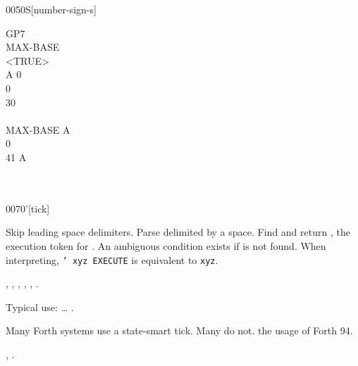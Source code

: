 \begin{worddef}[numS]{0050}{\num{}S}[number-sign-s]
\begin{testing}
		\word{:} GP7 \\
		\tab	{}  		MAX-BASE  \word{!} \\
		\tab	<TRUE> \\
		\tab	A 0  \\
		\tab[2]		 0    \\
		 \word{=}    30 \word{+} \word{=} \word{AND}  \\
		\tab	\word{LOOP} \\
		\tab	MAX-BASE A \word{DO} \\
		\tab[2]		 0   \word{num-end} \\
		 \word{=}   41  A \word{-} \word{+} \word{=}   \\
		\tab	{} \\
		\tab	{}  \word{!} \word{;} \\
	\end{testing}
\end{worddef}


\begin{worddef}{0070}{'}[tick]
\item {}

	Skip leading space delimiters. Parse  delimited by
	a space. Find  and return , the execution
	token for . An ambiguous condition exists if
	 is not found. When interpreting,
	\texttt{' xyz EXECUTE} is equivalent to \texttt{xyz}.

\see {},
	,
	,
	,
	,
	.

	\begin{rationale} %
		Typical use: {\ldots}  .

		Many Forth systems use a state-smart tick. Many do not.
		 the usage of Forth 94.

	\see {},
		.
	\end{rationale}

	\begin{testing} %
		 \\
	\end{testing}
\end{worddef}


